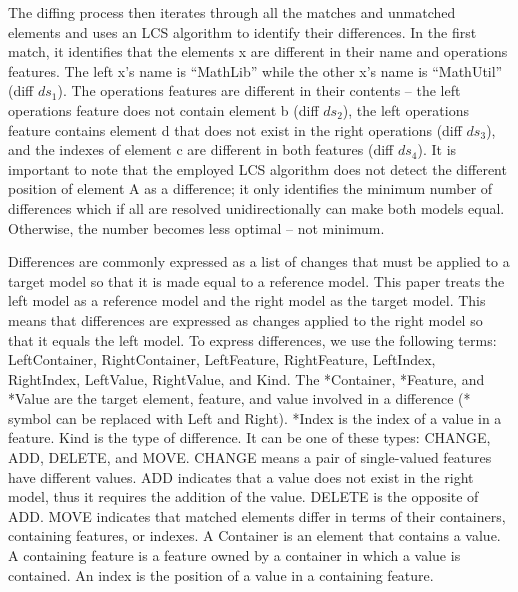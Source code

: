 \documentclass{jot}
\newcommand{\dk}[1]{\textcolor{blue}{\textbf{[Dimitris: #1]}}}
\begin{document}
    The diffing process then iterates through all the matches and unmatched elements and uses an LCS algorithm to identify their differences. In the first match, it identifies that the elements \textsf{x} are different in their \textsf{name} and \textsf{operations} features. The left \textsf{x}'s \textsf{name} is ``MathLib'' while the other \textsf{x}'s \textsf{name} is ``MathUtil'' (diff $ds_1$). The \textsf{operations} features are different in their contents -- the left \textsf{operations} feature does not contain element \textsf{b} (diff $ds_2$), the left \textsf{operations} feature contains element \textsf{d} that does not exist in the right \textsf{operations} (diff $ds_3$), and the indexes of element \textsf{c} are different in both features (diff $ds_4$). It is important to note that the employed LCS algorithm does not detect the different position of element \textsf{A} as a difference; it only identifies the minimum number of differences which if all are resolved unidirectionally can make both models equal. Otherwise, the number becomes less optimal -- not minimum.
    
    Differences are commonly expressed as a list of changes that must be applied to a target model so that it is made equal to a reference model.
    This paper treats the left model as a reference model and the right model as the target model.
    This means that differences are expressed as changes applied to the right model so that it equals the left model.
    To express differences, we use the following terms: \textsf{LeftContainer}, \textsf{RightContainer}, \textsf{LeftFeature}, \textsf{RightFeature}, \textsf{LeftIndex}, \textsf{RightIndex}, \textsf{LeftValue}, \textsf{RightValue}, and \textsf{Kind}. The \textsf{*Container}, \textsf{*Feature}, and \textsf{*Value} are the target element, feature, and value involved in a difference (\textsf{*} symbol can be replaced with \textsf{Left} and \textsf{Right}). \textsf{*Index} is the index of a value in a feature. \textsf{Kind} is the type of difference. It can be one of these types: \textsf{CHANGE}, \textsf{ADD}, \textsf{DELETE}, and \textsf{MOVE}. \textsf{CHANGE} means a pair of single-valued features 
    have different values. \textsf{ADD} indicates that a value does not exist in the right model, thus it requires the addition of the value. \textsf{DELETE} is the opposite
    of \textsf{ADD}. \textsf{MOVE} indicates that matched elements differ in terms of their containers, containing features, or indexes.
    A Container is an element that contains a value. A containing feature is a feature owned by a container in which a value is contained. An index is the position of a value in a containing feature.
    
\end{document}

